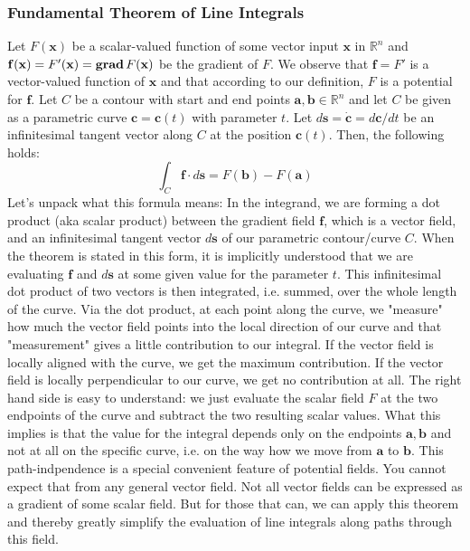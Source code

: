 \subsubsection{Fundamental Theorem of Line Integrals}
Let $F(\mathbf{x})$ be a scalar-valued function of some vector input $\mathbf{x}$ in $\mathbb{R}^n$ and $\mathbf{f(x)} = F'(\mathbf{x}) = \operatorname{\mathbf{grad}} F(\mathbf{x})$ be the gradient of $F$. We observe that $\mathbf{f} = F'$ is a vector-valued function of $\mathbf{x}$ and that according to our definition, $F$ is a potential for $\mathbf{f}$. Let $C$ be a contour with start and end points $\mathbf{a,b} \in \mathbb{R}^n$ and let $C$ be given as a parametric curve $\mathbf{c} = \mathbf{c}(t)$ with parameter $t$. Let $d\mathbf{s} = \dot{\mathbf{c}} = d\mathbf{c} / dt$ be an infinitesimal tangent vector along $C$ at the position $\mathbf{c}(t)$. Then, the following holds:
\begin{equation}
 \int_C \mathbf{f} \cdot d\mathbf{s} 
 = F(\mathbf{b}) - F(\mathbf{a}) 
\end{equation}
Let's unpack what this formula means: In the integrand, we are forming a dot product (aka scalar product) between the gradient field $\mathbf{f}$, which is a vector field, and an infinitesimal tangent vector $d\mathbf{s}$ of our parametric contour/curve $C$. When the theorem is stated in this form, it is implicitly understood that we are evaluating $\mathbf{f}$ and $d\mathbf{s}$ at some given value for the parameter $t$. This infinitesimal dot product of two vectors is then integrated, i.e. summed, over the whole length of the curve. Via the dot product, at each point along the curve, we "measure" how much the vector field points into the local direction of our curve and that "measurement" gives a little contribution to our integral. If the vector field is locally aligned with the curve, we get the maximum contribution. If the vector field is locally perpendicular to our curve, we get no contribution at all. The right hand side is easy to understand: we just evaluate the scalar field $F$ at the two endpoints of the curve and subtract the two resulting scalar values. What this implies is that the value for the integral depends only on the endpoints $\mathbf{a,b}$ and not at all on the specific curve, i.e. on the way how we move from $\mathbf{a}$ to $\mathbf{b}$. This path-indpendence is a special convenient feature of potential fields. You cannot expect that from any general vector field. Not all vector fields can be expressed as a gradient of some scalar field. But for those that can, we can apply this theorem and thereby greatly simplify the evaluation of line integrals along paths through this field.

